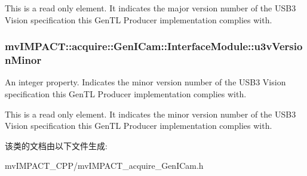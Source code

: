 This is a read only element. It indicates the major version number of the U\+S\+B3 Vision specification this Gen\+T\+L Producer implementation complies with. \hypertarget{classmv_i_m_p_a_c_t_1_1acquire_1_1_gen_i_cam_1_1_interface_module_ad6df74ba9a4ae0eff8d6a41cbb9aa314}{
\subsubsection[{u3v\+Version\+Minor}]{ mv\+I\+M\+P\+A\+C\+T\+::acquire\+::\+Gen\+I\+Cam\+::\+Interface\+Module\+::u3v\+Version\+Minor}}\label{classmv_i_m_p_a_c_t_1_1acquire_1_1_gen_i_cam_1_1_interface_module_ad6df74ba9a4ae0eff8d6a41cbb9aa314}


An integer property. Indicates the minor version number of the U\+S\+B3 Vision specification this Gen\+T\+L Producer implementation complies with. 

This is a read only element. It indicates the minor version number of the U\+S\+B3 Vision specification this Gen\+T\+L Producer implementation complies with. 

该类的文档由以下文件生成\+:\begin{DoxyCompactItemize}
\item 
mv\+I\+M\+P\+A\+C\+T\+\_\+\+C\+P\+P/mv\+I\+M\+P\+A\+C\+T\+\_\+acquire\+\_\+\+Gen\+I\+Cam.\+h\end{DoxyCompactItemize}
